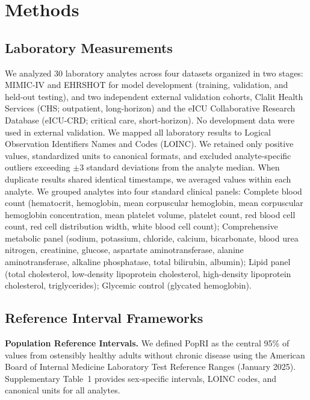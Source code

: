\documentclass[11pt]{article}
\begin{document}

\section*{Methods}

\subsection*{Laboratory Measurements}

We analyzed 30 laboratory analytes across four datasets organized in two stages: MIMIC-IV and EHRSHOT for model development (training, validation, and held-out testing), and two independent external validation cohorts, Clalit Health Services (CHS; outpatient, long-horizon) and the eICU Collaborative Research Database (eICU-CRD; critical care, short-horizon). No development data were used in external validation. We mapped all laboratory results to Logical Observation Identifiers Names and Codes (LOINC). We retained only positive values, standardized units to canonical formats, and excluded analyte-specific outliers exceeding $\pm$3 standard deviations from the analyte median. When duplicate results shared identical timestamps, we averaged values within each analyte. We grouped analytes into four standard clinical panels: Complete blood count (hematocrit, hemoglobin, mean corpuscular hemoglobin, mean corpuscular hemoglobin concentration, mean platelet volume, platelet count, red blood cell count, red cell distribution width, white blood cell count); Comprehensive metabolic panel (sodium, potassium, chloride, calcium, bicarbonate, blood urea nitrogen, creatinine, glucose, aspartate aminotransferase, alanine aminotransferase, alkaline phosphatase, total bilirubin, albumin); Lipid panel (total cholesterol, low-density lipoprotein cholesterol, high-density lipoprotein cholesterol, triglycerides); Glycemic control (glycated hemoglobin).

\subsection*{Reference Interval Frameworks}

\textbf{Population Reference Intervals.} We defined PopRI as the central 95\% of values from ostensibly healthy adults without chronic disease using the American Board of Internal Medicine Laboratory Test Reference Ranges (January 2025). Supplementary Table~1 provides sex-specific intervals, LOINC codes, and canonical units for all analytes.
\end{document}

